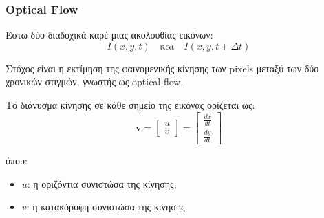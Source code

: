 \documentclass[12pt]{article}
\begin{document}
\subsubsection{Optical Flow}
Έστω δύο διαδοχικά καρέ μιας ακολουθίας εικόνων:
\[
I(x,y,t) \quad \text{και} \quad I(x,y,t+\Delta t)
\]

Στόχος είναι η εκτίμηση της φαινομενικής κίνησης των pixels
μεταξύ των δύο χρονικών στιγμών, γνωστής ως optical flow.

Το διάνυσμα κίνησης σε κάθε σημείο της εικόνας ορίζεται ως:
\[
\mathbf{v}
=
\begin{bmatrix}
u \\
v
\end{bmatrix}
=
\begin{bmatrix}
\frac{dx}{dt} \\
\frac{dy}{dt}
\end{bmatrix}
\]

όπου:
\begin{itemize}
  \item $u$: η οριζόντια συνιστώσα της κίνησης,
  \item $v$: η κατακόρυφη συνιστώσα της κίνησης.
\end{itemize}
\end{document}
